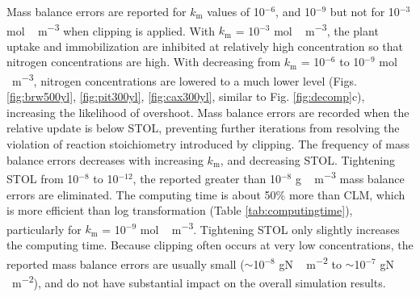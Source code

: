 \documentclass[gmd, manuscript]{copernicus}
\begin{document}
Mass balance errors are reported for $k_\text{m}$ values of 10$^{-6}$, and
10$^{-9}$ but not for 10$^{-3}$ \unit{mol\,m^{-3}} when clipping is applied.
With $k_\text{m}$ = 10$^{-3}$ \unit{mol\,m^{-3}}, the plant uptake and
immobilization are inhibited at relatively high concentration so that nitrogen
concentrations are high. With decreasing from $k_\text{m}$ = 10$^{-6}$ to
10$^{-9}$ \unit{mol\,m^{-3}}, nitrogen concentrations are lowered to a much lower
level (Figs. \ref{fig:brw500yl}, \ref{fig:pit300yl}, \ref{fig:cax300yl},
similar to Fig. \ref{fig:decomp}c), increasing the likelihood of overshoot.
Mass balance errors are recorded when the relative update is below STOL,
preventing further iterations from resolving the violation of reaction
stoichiometry introduced by clipping. The frequency of mass balance errors
decreases with increasing $k_\text{m}$, and decreasing STOL. Tightening STOL
from 10$^{-8}$ to 10$^{-12}$, the reported greater than 10$^{-8}$
\unit{g\,m^{-3}} mass balance errors are eliminated. The computing time is
about 50\% more than CLM, which is more efficient than log transformation
(Table \ref{tab:computingtime}), particularly for $k_\text{m}$ = 10$^{-9}$
\unit{mol\,m^{-3}}. Tightening STOL only slightly increases the computing time. 
Because clipping often occurs at very low concentrations, the reported mass
balance errors are usually small ($\sim$10$^{-8}$  \unit{gN\,m^{-2}} to
$\sim$10$^{-7}$  \unit{gN\,m^{-2}}), and do not have substantial impact
on the overall simulation results. 
\end{document}
